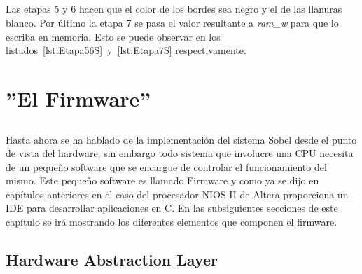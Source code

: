 \documentclass[a4paper,12pt,titlepage,final]{book}
\begin{document}


\paragraph{}
Las etapas 5 y 6 hacen que el color de los bordes sea negro y el de las llanuras blanco. Por último la etapa 7 se pasa el valor resultante a \textit{ram\_w} para que lo escriba en memoria. Esto se puede observar en los listados~\ref{lst:Etapa56S}~y~\ref{lst:Etapa7S} respectivamente.





\chapter{''El Firmware''}
\section*{}
\subsection*{}
\subsubsection*{}

\paragraph{}
Hasta ahora se ha hablado de la implementación del sistema Sobel desde el punto de vista del hardware, sin embargo todo sistema que involucre una CPU necesita de un pequeño software que se encargue de controlar el funcionamiento del mismo. Este pequeño software es llamado Firmware y como ya se dijo en capítulos anteriores en el caso del procesador NIOS II de Altera proporciona un IDE para desarrollar aplicaciones en C. En las subsiguientes secciones de este capítulo se irá mostrando los diferentes elementos que componen el firmware.

\section{Hardware Abstraction Layer}
\end{document}
